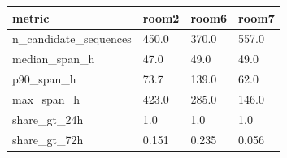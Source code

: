 \begin{tabular}{llll}
\hline
metric & room2 & room6 & room7 \\
\hline
n\_candidate\_sequences & 450.0 & 370.0 & 557.0 \\
median\_span\_h & 47.0 & 49.0 & 49.0 \\
p90\_span\_h & 73.7 & 139.0 & 62.0 \\
max\_span\_h & 423.0 & 285.0 & 146.0 \\
share\_gt\_24h & 1.0 & 1.0 & 1.0 \\
share\_gt\_72h & 0.151 & 0.235 & 0.056 \\
\hline
\end{tabular}
